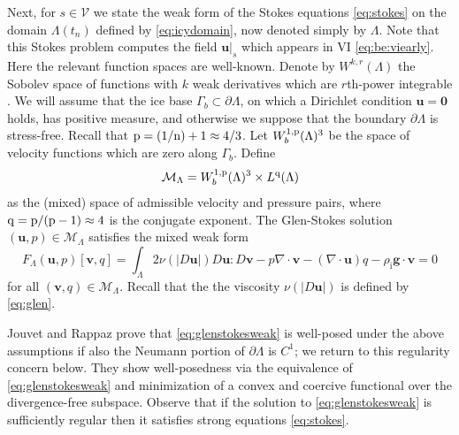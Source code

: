 \documentclass[hidelinks,onefignum,onetabnum,final]{siamart220329}  %
\newcommand{\Div}{\nabla\cdot}
\newcommand{\bg}{\mathbf{g}}
\newcommand{\bu}{\mathbf{u}}
\newcommand{\bv}{\mathbf{v}}
\newcommand{\bzero}{\bm{0}}
\newcommand{\cV}{\mathcal{V}}
\newcommand{\nn}{{\text{\textnormal{n}}}}
\newcommand{\pp}{{\text{\textnormal{p}}}}
\newcommand{\qq}{{\text{\textnormal{q}}}}
\newcommand{\rhoi}{\rho_{\text{i}}}
\begin{document}
Next, for $s\in \cV$ we state the weak form of the Stokes equations \eqref{eq:stokes} on the domain $\Lambda(t_n)$ defined by \eqref{eq:icydomain}, now denoted simply by $\Lambda$.  Note that this Stokes problem computes the field $\bu|_s$ which appears in VI \eqref{eq:be:viearly}.  Here the relevant function spaces are well-known.  Denote by $W^{k,r}(\Lambda)$ the Sobolev space of functions with $k$ weak derivatives which are $r$th-power integrable \cite{Evans2010}.  We will assume that the ice base $\Gamma_b\subset\partial \Lambda$, on which a Dirichlet condition $\bu=\bzero$ holds, has positive measure, and otherwise we suppose that the boundary $\partial \Lambda$ is stress-free.  Recall that $\pp=(1/\nn)+1\approx 4/3$.  Let $W_b^{1,\pp}(\Lambda)^{3}$ be the space of velocity functions which are zero along $\Gamma_b$.  Define
\begin{equation}
\mathcal{M}_\Lambda = W_b^{1,\pp}(\Lambda)^3 \times L^\qq(\Lambda)  \label{eq:mixed}
\end{equation}
as the (mixed) space of admissible velocity and pressure pairs, where $\qq=\pp/(\pp-1)\approx 4$ is the conjugate exponent.  The Glen-Stokes solution $(\bu,p) \in \mathcal{M}_\Lambda$ satisfies the mixed weak form
\begin{equation}
F_\Lambda(\bu,p)[\bv,q] = \int_\Lambda 2 \nu(|D\bu|) D\bu : D\bv - p \Div\bv - (\Div\bu) q - \rhoi \bg \cdot \bv = 0 \label{eq:glenstokesweak}
\end{equation}
for all $(\bv,q) \in \mathcal{M}_\Lambda$.  Recall that the the viscosity $\nu(|D\bu|)$ is defined by \eqref{eq:glen}.

Jouvet and Rappaz \cite{JouvetRappaz2011} prove that \eqref{eq:glenstokesweak} is well-posed under the above assumptions if also the Neumann portion of $\partial\Lambda$ is $C^1$; we return to this regularity concern below.  They show well-posedness via the equivalence of \eqref{eq:glenstokesweak} and minimization of a convex and coercive functional over the divergence-free subspace.  Observe that if the solution to \eqref{eq:glenstokesweak} is sufficiently regular then it satisfies strong equations \eqref{eq:stokes}.
\end{document}
